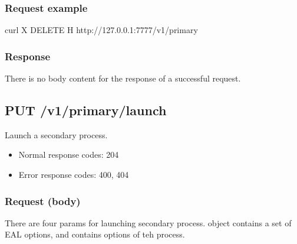 \documentclass[a4paper,11pt,openany,oneside,english]{sphinxmanual}
\begin{document}
\subsubsection{Request example}
\label{\detokenize{api_ref/spp_primary:id15}}
\begin{sphinxVerbatim}[commandchars=\\\{\},formatcom=\footnotesize]
 curl \PYGZhy{}X DELETE \PYGZhy{}H  
  http://127.0.0.1:7777/v1/primary
\end{sphinxVerbatim}


\subsubsection{Response}
\label{\detokenize{api_ref/spp_primary:id16}}
There is no body content for the response of a successful  request.


\subsection{PUT /v1/primary/launch}
\label{\detokenize{api_ref/spp_primary:put-v1-primary-launch}}
Launch a secondary process.
\begin{itemize}
\item {} 
Normal response codes: 204

\item {} 
Error response codes: 400, 404

\end{itemize}


\subsubsection{Request (body)}
\label{\detokenize{api_ref/spp_primary:id17}}
There are four params for launching secondary process.  object
contains a set of EAL options, and  contains options of teh process.
\end{document}
